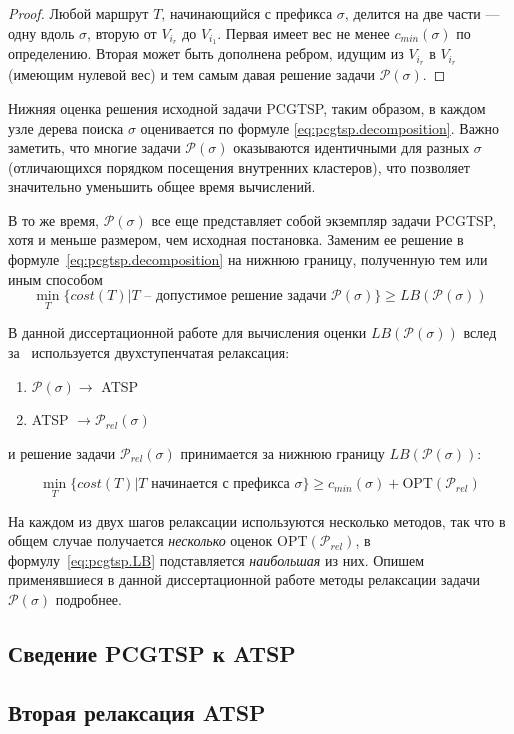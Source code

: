 \begin{proof}
  Любой маршрут $T$,
  начинающийся с префикса $\sigma$,
  делится на две части ---
  одну вдоль $\sigma$,
  вторую от $V_{i_r}$ до ${V_{i_1}}$.
  Первая имеет вес не менее $c_{min}(\sigma)$
  по определению.
  Вторая может быть дополнена ребром,
  идущим из $V_{i_r}$ в ${V_{i_r}}$
  (имеющим нулевой вес)
  и тем самым давая решение задачи
  $\mathcal P(\sigma)$.
\end{proof}

Нижняя оценка решения исходной задачи PCGTSP,
таким образом,
в каждом узле дерева поиска
$\sigma$
оценивается по формуле \eqref{eq:pcgtsp.decomposition}.
Важно заметить,
что многие задачи $\mathcal  P(\sigma)$
оказываются идентичными для разных $\sigma$
(отличающихся порядком посещения внутренних кластеров),
что позволяет значительно уменьшить общее время вычислений.

В то же время,
$\mathcal P(\sigma)$
все еще представляет собой экземпляр
задачи PCGTSP,
хотя и меньше размером,
чем исходная постановка.
Заменим ее решение в формуле~\eqref{eq:pcgtsp.decomposition}
на нижнюю границу,
полученную тем или иным способом
$$
\min_{T}\{cost(T)| T \text{ -- допустимое решение задачи } \mathcal P(\sigma)\}
\geqslant LB(\mathcal P(\sigma))
$$

В данной диссертационной работе для вычисления оценки
$LB(\mathcal P(\sigma))$
вслед за~\cite{SALMAN2020163}
используется двухступенчатая релаксация:
\begin{enumerate}
  \item $\mathcal P(\sigma) \to$ ATSP
  \item ATSP $\to \mathcal P_{rel}(\sigma)$
\end{enumerate}
и решение задачи $\mathcal P_{rel}(\sigma)$
принимается за нижнюю границу
$LB(\mathcal P(\sigma))$:

\begin{equation}
  \label{eq:pcgtsp.LB}
  \min_T \{cost(T)| T \text{ начинается с префикса } \sigma\}
  \geqslant
  c_{min}(\sigma) + \mathrm{OPT}(\mathcal P_{rel})
\end{equation}

На каждом из двух шагов релаксации используются
несколько методов,
так что в общем случае получается \textit{несколько}
оценок
$\mathrm{OPT}(\mathcal P_{rel})$,
в формулу~\eqref{eq:pcgtsp.LB}
подставляется \textit{наибольшая} из них.
Опишем применявшиеся в данной диссертационной работе
методы релаксации задачи
$\mathcal P(\sigma)$
подробнее.

\subsection*{Сведение PCGTSP к ATSP}



\subsection*{Вторая релаксация ATSP }

